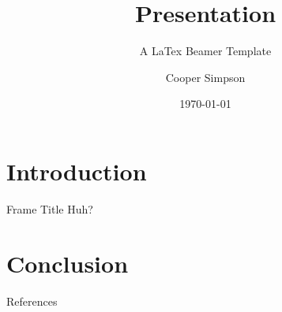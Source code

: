 \documentclass{Presentation}
\title{Presentation}
\subtitle{A LaTex Beamer Template}
\institute{Institute of Stufff}
\author{Cooper Simpson}
\date{\today}
\begin{document}
	
	\begin{frame}[plain]
	    \maketitle
	\end{frame}

	\section{Introduction}
	
	\begin{frame}{Frame Title}
		Huh?
	\end{frame}

	\section{Conclusion}

	\begin{frame}[allowframebreaks]{References}
	\end{frame}
\end{document}
